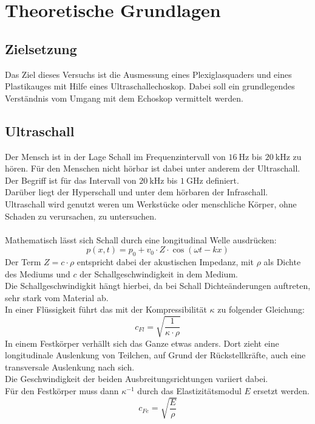 \newpage
\section{Theoretische Grundlagen}


\subsection{Zielsetzung}
Das Ziel dieses Versuchs ist die Ausmessung eines Plexiglasquaders und eines Plastikauges mit Hilfe eines Ultraschallechoskop. 
Dabei soll ein grundlegendes Verständnis vom Umgang mit dem Echoskop vermittelt werden.

\subsection{Ultraschall}

\noindent
Der Mensch ist in der Lage Schall im Frequenzintervall von $\SI{16}{\hertz}$ bis $\SI{20}{\kilo\hertz}$ zu hören. 
Für den Menschen nicht hörbar ist dabei unter anderem der Ultraschall. 
Der Begriff ist für das Intervall von $\SI{20}{\kilo\hertz}$ bis $\SI{1}{\giga\hertz}$ definiert.\\
Darüber liegt der Hyperschall und unter dem hörbaren der Infraschall.\\
Ultraschall wird genutzt weren um Werkstücke oder menschliche Körper, ohne Schaden zu verursachen, zu untersuchen.\\\\

\noindent
Mathematisch lässt sich Schall durch eine longitudinal Welle ausdrücken:
\begin{equation*}
    p(x,t)=p_0+v_0\cdot Z\cdot \cos{(\omega t-kx)}
\end{equation*}
Der Term $Z=c\cdot \rho$ entspricht dabei der akustischen Impedanz, mit $\rho$ als Dichte des Mediums und $c$ der Schallgeschwindigkeit in dem Medium.\\
Die Schallgeschwindigkit hängt hierbei, da bei Schall Dichteänderungen auftreten, sehr stark vom Material ab.\\
In einer Flüssigkeit führt das mit der Kompressibilität $\kappa$ zu folgender Gleichung:
\begin{equation*}
    c_{Fl}=\sqrt{\frac{1}{\kappa\cdot\rho}}
\end{equation*}
In einem Festkörper verhällt sich das Ganze etwas anders. 
Dort zieht eine longitudinale Auslenkung von Teilchen, auf Grund der Rückstellkräfte, auch eine transversale Auslenkung nach sich.\\
Die Geschwindigkeit der beiden Ausbreitungsrichtungen variiert dabei.\\
Für den Festkörper muss dann $\kappa^{-1}$ durch das Elastizitätsmodul $E$ ersetzt werden.
\begin{equation*}
    c_{Fe}=\sqrt{\frac{E}{\rho}}
\end{equation*}


